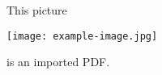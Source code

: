 \documentclass{article}
\begin{document}
This picture
\begin{center}
\texttt{[image: example-image.jpg]}
\end{center}
is an imported PDF.
\end{document}
